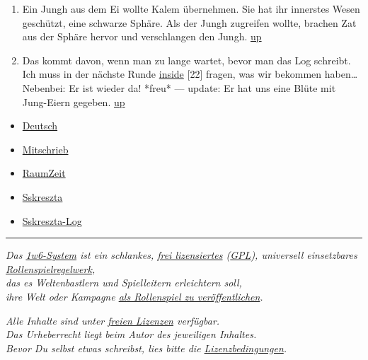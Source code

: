 \documentclass[11pt]{article}
\begin{document}
\begin{enumerate}
\item
  Ein Jungh aus dem Ei wollte Kalem übernehmen. Sie hat ihr innerstes
  Wesen geschützt, eine schwarze Sphäre. Als der Jungh zugreifen wollte,
  brachen Zat aus der Sphäre hervor und verschlangen den Jungh.
  \href{http://1w6.org/print/book/export/html/59\#fnref:kalem-innen}{up}
\item
  Das kommt davon, wenn man zu lange wartet, bevor man das Log schreibt.
  Ich muss in der nächste Runde
  \href{http://1w6.org/uzanto/inside}{inside} {[}22{]} fragen, was wir
  bekommen haben\ldots{} Nebenbei: Er ist wieder da! *freu* --- update:
  Er hat uns eine Blüte mit Jung-Eiern gegeben.
  \href{http://1w6.org/print/book/export/html/59\#fnref:1}{up}
\end{enumerate}
\begin{itemize}
\item
  \href{http://1w6.org/stichwort/deutsch}{Deutsch}
\item
  \href{http://1w6.org/stichwort/mitschrieb}{Mitschrieb}
\item
  \href{http://1w6.org/stichwort/raumzeit}{RaumZeit}
\item
  \href{http://1w6.org/stichwort/sskreszta}{Sskreszta}
\item
  \href{http://1w6.org/stichwort/sskreszta-log}{Sskreszta-Log}
\end{itemize}
\begin{center}\rule{3in}{0.4pt}\end{center}

\emph{Das \href{http://1w6.org/deutsch/regeln/}{1w6-System} ist ein schlankes,
\href{http://1w6.org/deutsch/anhang/das-ein-w-rfel-system-jetzt-unter-der-gplv3}{frei
lizensiertes} (\href{http://lizenz.1w6.org}{GPL}), universell einsetzbares
\href{http://de.wikipedia.org/wiki/Pen-\&-Paper-Rollenspiel\#Regelsysteme}{Rollenspielregelwerk},
\\ das es Weltenbastlern und Spielleitern erleichtern soll, \\ ihre
Welt oder Kampagne
\href{http://1w6.org/deutsch/regeln/das-ews-deine-beduerfnisse-anpassen/deine-welt-als-rollenspiel-veroeffentlichen}{als
Rollenspiel zu veröffentlichen}.}

\emph{Alle Inhalte sind unter \href{http://lizenz.1w6.org}{freien
Lizenzen} verfügbar. \\ Das Urheberrecht liegt beim Autor des
jeweiligen Inhaltes. \\ Bevor Du selbst etwas schreibst, lies bitte die
\href{http://lizenz.1w6.org}{Lizenzbedingungen}.}
\end{document}
